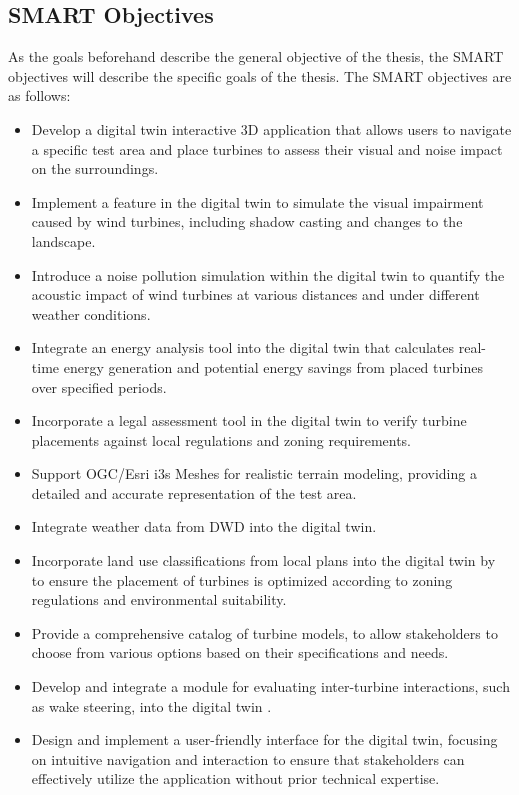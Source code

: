 \documentclass[11pt, titlepage, a4paper]{article}
\begin{document}
\begin{linenumbers}
    \subsection{SMART Objectives}
    As the goals beforehand describe the general objective of the thesis, the SMART objectives will describe the specific goals of the thesis. The SMART objectives are as follows:
    \begin{itemize}[label={--}]
        \item Develop a digital twin interactive 3D application  that allows users to navigate a specific test area and place turbines to assess their visual and noise impact on the surroundings.
        \item Implement a feature  in the digital twin to simulate the visual impairment caused by wind turbines, including shadow casting and changes to the landscape.
        \item Introduce a noise pollution simulation within the digital twin to quantify the acoustic impact of wind turbines at various distances and under different weather conditions.
        \item Integrate an energy analysis tool into the digital twin  that calculates real-time energy generation and potential energy savings from placed turbines over specified periods.
        \item Incorporate a legal assessment tool  in the digital twin to verify turbine placements against local regulations and zoning requirements.
        \item Support OGC/Esri i3s Meshes for realistic terrain modeling, providing a detailed and accurate representation of the test area.
        \item Integrate weather data from DWD into the digital twin.
        \item Incorporate land use classifications from local plans into the digital twin by to ensure the placement of turbines is optimized according to zoning regulations and environmental suitability.
        \item Provide a comprehensive catalog of turbine models, to allow stakeholders to choose from various options based on their specifications and needs.
        \item Develop and integrate a module for evaluating inter-turbine interactions, such as wake steering, into the digital twin \cite{howlandWindFarmPower2019a}.
        \item  Design and implement a user-friendly interface for the digital twin, focusing on intuitive navigation and interaction to ensure that stakeholders can effectively utilize the application without prior technical expertise.

\end{itemize}
\end{linenumbers}
\end{document}
